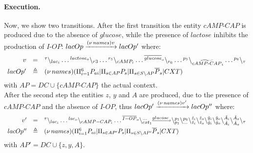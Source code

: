 \paragraph{Execution.}
Now, we show two transitions. 
After the first transition the entity $cAMP\textrm{-}CAP$ is produced due to the absence of $glucose$, while the presence of $lactose$ inhibits the production of $I\textrm{-}OP$:
$lacOp \xrightarrow{(\nu\, names) v} lacOp'$
where: 
{\small
$$
\begin{array}{rcl}
v & = & {}^{\tau} \backslash_{lac_i}\dots {}^{lactose_o} \backslash_{r3}\dots
 {}^{r_5} \backslash_{cAMP_i}\dots
  {}^{\overline{glucose}_o} \backslash_{r_6}
\dots {}^{p_5} \backslash_{\widetilde{cAMP\textrm{-}CAP}_i}\dots {}^{p_6} \backslash_{\tau}\\[5pt]
lacOp' & \triangleq & (\nu\, names) (\Pi_{i =1}^6 P_{ai} | \Pi_{s \in AP} P_s |   \Pi_{s \in S \backslash AP} \overline{P}_s| CXT)
\end{array}
$$ 
}
with $AP= DC\cup \{cAMP\textrm{-}CAP\}$  the actual context.\\
After the second step the entities $z$, $y$ and $A$ are produced, due to the presence of $cAMP\textrm{-}CAP$ and the absence of $I\textrm{-}OP$, thus
$lacOp' \xrightarrow{(\nu\, names)v'} lacOp''$
where:
{\small
$$
\begin{array}{rcl}
v' & = & {}^{\tau} \backslash_{lac_i}\dots {}^{lac_o} \backslash_{cAMP-CAP_i}\dots {}^{\overline{I-OP}_o}
\backslash_{cxt_1}^{\dots}{}^{\underline{glucose}_o}\backslash_{p_1}^{p_1}
\backslash_{\dots}^{p_6}\backslash_{\tilde{z}_i}^{\tilde{z}_i}\backslash_{\tilde{z}_o}^{\tilde{z}_o}
\backslash_{\tilde{y}_i}^{\tilde{y}_i}\backslash_{\tilde{y}_o}^{\tilde{y}_o}\backslash_{\tilde{A}_i}^{\tilde{A}_i}\backslash_{\tilde{A}_o}^{\tilde{A}_o}\backslash_{\tau}\\[5pt]
lacOp'' & \triangleq & (\nu\, names) (\Pi_{i =1}^{6} P_{ai} | \Pi_{s \in AP'} P_s |   \Pi_{s \in S \backslash AP'} \overline{P}_s| CXT)
\end{array}
$$
}
with $AP'= DC\cup \{z,y,A\} $.


